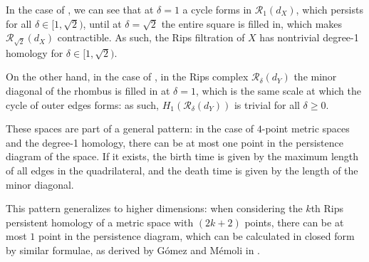 \documentclass[a4paper,UKenglish,thm-restate]{article}
\theoremstyle{definition}
\begin{document}
    In the case of , we can see that at $\delta = 1$ a cycle forms in $\mathcal{R}_1(d_X)$, which persists for all $\delta \in [1, \sqrt{2})$, until at $\delta = \sqrt{2}$ the entire square is filled in, which makes $\mathcal{R}_{\sqrt{2}}(d_X)$ contractible. As such, the Rips filtration of $X$ has nontrivial degree-1 homology for $\delta \in [1, \sqrt{2})$.

    On the other hand, in the case of , in the Rips complex $\mathcal{R}_\delta(d_Y)$ the minor diagonal of the rhombus is filled in at $\delta = 1$, which is the same scale at which the cycle of outer edges forms: as such, $H_1(\mathcal{R}_\delta(d_Y))$ is trivial for all $\delta \geq 0$. 

    These spaces are part of a general pattern: in the case of $4$-point metric spaces and the degree-1 homology, there can be at most one point in the persistence diagram of the space. If it exists, the birth time is given by the maximum length of all edges in the quadrilateral, and the death time is given by the length of the minor diagonal.

    This pattern generalizes to higher dimensions: when considering the $k$th Rips persistent homology of a metric space with $(2k+2)$ points, there can be at most $1$ point in the persistence diagram, which can be calculated in closed form by similar formulae, as derived by G\'omez and M\'emoli in \cite{curvaturesets}.
\end{document}

